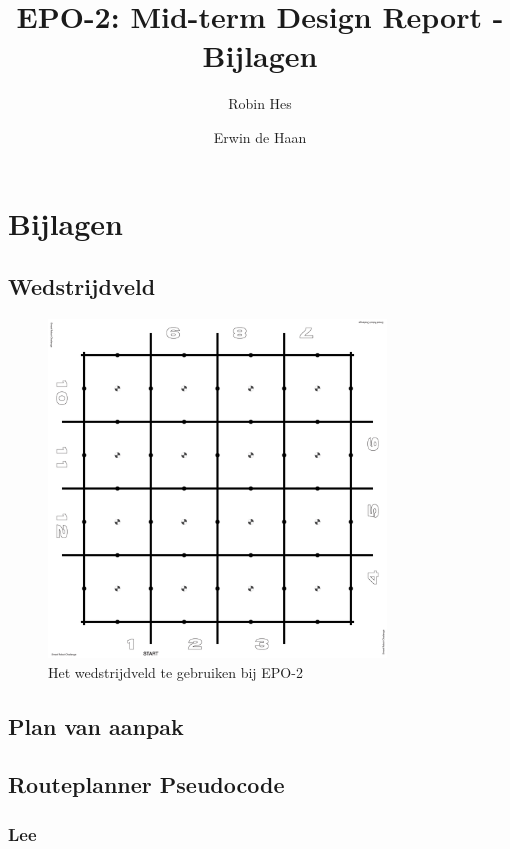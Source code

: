 \documentclass{report}
\title{EPO-2: Mid-term Design Report - Bijlagen}
\author{Robin Hes \and Erwin de Haan}
\begin{document}
\chapter{Bijlagen}
\label{ch:bijlagen}

\section{Wedstrijdveld}
\label{sec:field}

\begin{figure}[H]
	\centering
	\includegraphics[width=0.8\textwidth]{competitionField2440x2440-rc.pdf}
	\caption{Het wedstrijdveld te gebruiken bij EPO-2}
	\label{fig:field}
\end{figure}

\newpage
\section{Plan van aanpak}
\label{sec:pva}



\section{Routeplanner Pseudocode}
\label{sec:pseudocode}

\subsection{Lee}
\label{ssec:pseudocode-lee}
\cite{pseudocode-lee}
\end{document}
